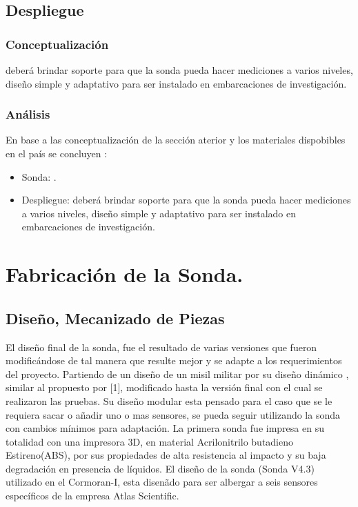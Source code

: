 \subsection{Despliegue}
\subsubsection{Conceptualizaci\'on}

deber\'a brindar soporte para que la sonda pueda hacer mediciones a varios niveles, dise\~no simple y adaptativo para ser instalado en embarcaciones de investigaci\'on.

\subsubsection{An\'alisis}
En base a las conceptualizaci\'on de la secci\'on aterior y los materiales dispobibles en el pa\'is se concluyen  :
\begin{itemize}
    \item Sonda: .
    \item Despliegue: deber\'a brindar soporte para que la sonda pueda hacer mediciones a varios niveles, dise\~no simple y adaptativo para ser instalado en embarcaciones de investigaci\'on.
\end{itemize}


\section{Fabricaci\'on de la Sonda.}

\subsection{Diseño, Mecanizado de Piezas}
El diseño final de la sonda, fue el resultado de varias versiones que fueron modificándose de tal manera que resulte mejor y se adapte a los requerimientos del proyecto.
Partiendo de un diseño de un misil militar por su dise\~no din\'amico , similar al propuesto por [1], modificado hasta la versión final con el cual se realizaron las pruebas. Su diseño modular esta pensado para el caso que se le requiera sacar o añadir uno o mas sensores, se pueda seguir utilizando la sonda con cambios mínimos para adaptación.
La primera sonda fue impresa en su totalidad con una impresora 3D, en material Acrilonitrilo butadieno Estireno(ABS), por sus propiedades de alta resistencia al impacto y su baja degradación en presencia de líquidos. 
El diseño de la sonda (Sonda V4.3) utilizado en el Cormoran-I, esta disen\~ado para ser albergar a seis sensores específicos de la empresa Atlas Scientific.

